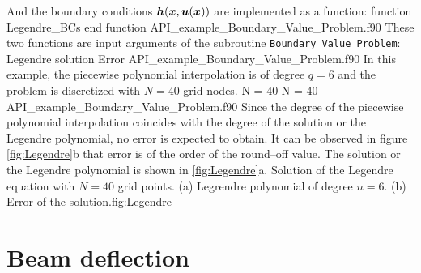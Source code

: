               And the boundary conditions $\boldsymbol{h} (\boldsymbol{x},\boldsymbol{u}(\boldsymbol{x})) $  are  implemented as a function:
              \vspace{0.5cm} 
              {function Legendre_BCs}
              {end function}
              {API_example_Boundary_Value_Problem.f90}
              These two functions are input arguments of the subroutine \verb|Boundary_Value_Problem|:  
              \vspace{0.5cm} 
              {Legendre solution}
              {Error}
              {API_example_Boundary_Value_Problem.f90}
              In this example, the piecewise polynomial interpolation is of degree $ q=6 $ and the problem is discretized with $ N = 40 $ 
              grid nodes. 
               \vspace{0.5cm} 
                     {N = 40}
                     {N = 40}
                     {API_example_Boundary_Value_Problem.f90}
              Since the degree of the piecewise polynomial interpolation coincides with the degree of the solution or the Legendre 
              polynomial, no error is expected to obtain.  
              It can be observed in figure  \ref{fig:Legendre}b that error is of the order of the round--off value.  The solution or the 
              Legendre polynomial is shown in  \ref{fig:Legendre}a.
              \twographs
              {}
              {}
              {Solution of the Legendre equation with $N=40$ grid points. (a) Legrendre polynomial of degree   $n=6$. (b) Error of the 
              solution.}{fig:Legendre}
       
\newpage 
\section{Beam deflection}\label{beam} 

